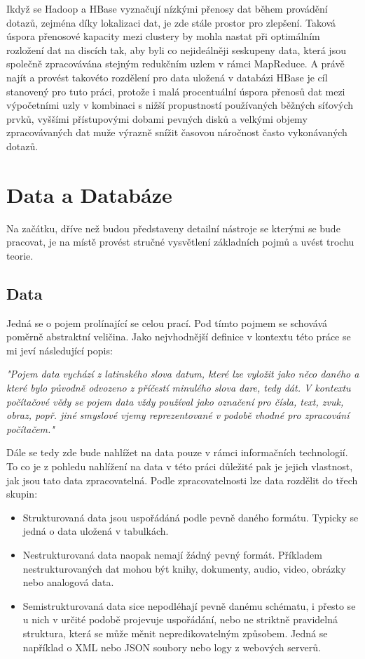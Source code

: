 \documentclass[thesis=M,czech]{FITthesis}[2012/06/26]
\begin{document}
\begin{introduction}
Ikdyž se Hadoop a HBase vyznačují nízkými přenosy dat během provádění dotazů, zejména díky lokalizaci dat, je zde stále prostor pro zlepšení. Taková úspora přenosové kapacity mezi clustery by mohla nastat při optimálním rozložení dat na discích tak, aby byli co nejideálněji seskupeny data, která jsou společně zpracovávána stejným redukčním uzlem v rámci MapReduce. A právě najít a provést takovéto rozdělení pro data uložená v databázi HBase je cíl stanovený pro tuto práci, protože i malá procentuální úspora přenosů dat mezi výpočetními uzly v kombinaci s nižší propustností používaných běžných síťových prvků, vyššími přístupovými dobami pevných disků a velkými objemy zpracovávaných dat muže výrazně snížit časovou náročnost často vykonávaných dotazů. 


\end{introduction}
\chapter{Data a Databáze}
Na začátku, dříve než budou představeny detailní nástroje se kterými se bude pracovat, je na místě provést stručné vysvětlení základních pojmů a uvést trochu teorie. 
\section{Data}
Jedná se o pojem prolínající se celou prací. Pod tímto pojmem se schovává poměrně abstraktní veličina. Jako nejvhodnější definice v kontextu této práce se mi jeví následující popis:

\medskip
\textit{"Pojem data vychází z latinského slova datum, které lze vyložit jako něco daného a které
bylo původně odvozeno z příčestí minulého slova dare, tedy dát. V kontextu počítačové
vědy se pojem data vždy používal jako označení pro čísla, text, zvuk, obraz, popř. jiné
smyslové vjemy reprezentované v podobě vhodné pro zpracování počítačem."} \cite{data}
\medskip

Dále se tedy zde bude nahlížet na data pouze v rámci informačních technologií. To co je z pohledu nahlížení na data v této práci důležité pak je jejich vlastnost, jak jsou tato data zpracovatelná. Podle zpracovatelnosti lze data rozdělit do třech skupin:
\begin{itemize}
\item Strukturovaná data jsou uspořádáná podle pevně daného formátu. Typicky se jedná o data uložená v tabulkách.

\item Nestrukturovaná data naopak nemají žádný pevný formát. Příkladem nestrukturovaných dat mohou být knihy, dokumenty, audio, video, obrázky nebo analogová data.

\item Semistrukturovaná data sice nepodléhají pevně danému schématu, i přesto se u nich v určité podobě projevuje uspořádání, nebo ne striktně pravidelná struktura, která se může měnit nepredikovatelným způsobem. Jedná se například o XML nebo JSON soubory nebo logy z webových serverů.
\end{itemize}
 
\end{document}
